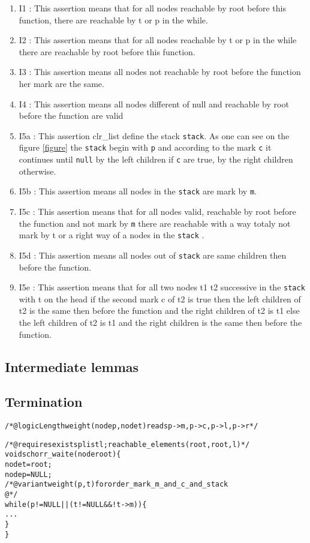 \begin {enumerate}
\item {I1} : This assertion means that for all nodes reachable by root
  before this function, there are reachable by t or p in the while.
\item {I2} : This assertion means that for all nodes reachable by t or
  p in the while there are reachable by root before this function.
\item {I3} : This assertion means all nodes not reachable by root before the
  function her mark are the same.
\item {I4} :  This assertion means all nodes different of null and
  reachable by root before the function are valid
\item {I5a} : This assertion clr\_list define the stack
  \texttt{stack}. As one can see on the figure \ref{figure} the
  \texttt{stack} begin with \texttt{p} and according to the mark \texttt{c} it
  continues until \texttt{null} by the left children if \texttt{c} are true, by the right children otherwise. 
\item {I5b} : This assertion means all nodes in the
  \texttt{stack} are mark by \texttt{m}.
\item {I5c} : This assertion means that for all nodes valid, reachable by root
  before the function and not mark by \texttt{m} there are reachable with a way
  totaly not mark by t or a right way of a nodes in the \texttt{stack} .
\item {I5d} : This assertion means all nodes out of \texttt{stack} are
  same children then before the function. 
\item {I5e} : This assertion means that for all two nodes t1 t2 successive in
  the \texttt{stack} with t on the head if the second mark c of t2 is
  true then the left children of t2 is the same then before the
  function and the right children of t2 is t1 else the left children
  of t2 is t1 and the right children  is the same then before the
  function.

\end{enumerate}
\subsection{Intermediate lemmas}

\subsection{Termination}

\begin{alltt}
/*@ logic Length weight(node p , node t) reads p->m,p->c,p->l,p->r*/

/*@ requires \bs{}exists plist l; reachable_elements(root,root,l) */
void schorr_waite(node root) \{
  node t = root;
  node p = NULL;
  /*@variant weight(p,t) for order_mark_m_and_c_and_stack 
    @*/
  while (p != NULL || (t != NULL && ! t->m)) \{
   ...
  \}
\}
\end{alltt}

